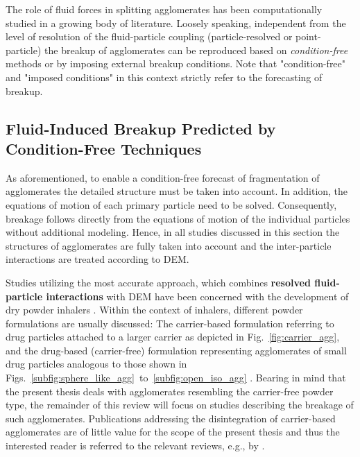The role of fluid forces in splitting agglomerates has been
computationally studied in a growing body of literature. Loosely
speaking, independent from the level of resolution of the
fluid-particle coupling (particle-resolved or point-particle) the
breakup of agglomerates can be reproduced based on
\emph{condition-free} methods or by imposing {external breakup
  conditions}. Note that "condition-free" and "imposed conditions" in
this context strictly refer to the forecasting of breakup.

\subsection{Fluid-Induced Breakup Predicted by Condition-Free
Techniques}
\label{sec:break_fluid_DEM}

As aforementioned, to enable a condition-free forecast of
fragmentation of agglomerates the detailed structure must be taken
into account. In addition, the equations of motion of each primary
particle need to be solved.  Consequently, breakage follows directly
from the equations of motion of the individual particles without
additional modeling. Hence, in all studies discussed in this section
the structures of agglomerates are fully taken into account and the
inter-particle interactions are treated according to DEM.

 Studies utilizing the most accurate approach, which combines
 \textbf{resolved
 fluid-particle interactions} with DEM have been concerned with the
 development of dry powder inhalers
 \citep[e.g.,][]{cui2018application,vanwachem2017simulation}. Within
 the context of inhalers, different powder formulations are usually
 discussed: The carrier-based formulation referring to drug particles
 attached to a larger carrier as depicted in
 Fig.~\ref{fig:carrier_agg}, and the drug-based (carrier-free)
 formulation representing agglomerates of small drug particles
 analogous to those shown in
 Figs.~\ref{subfig:sphere_like_agg}~to~\ref{subfig:open_iso_agg}
 \citep{longest2013aerodynamic}. Bearing in mind that the present
 thesis deals with agglomerates resembling the carrier-free powder
 type, the remainder of this review will focus on studies describing
 the breakage of such agglomerates. Publications addressing the
 disintegration of carrier-based agglomerates are of little value for
 the scope of the present thesis and thus the interested reader is
 referred to the relevant reviews, e.g., by
 \citet{zheng2021flow,yang2015numerical,sommerfeld2019potential}.
 \newline

